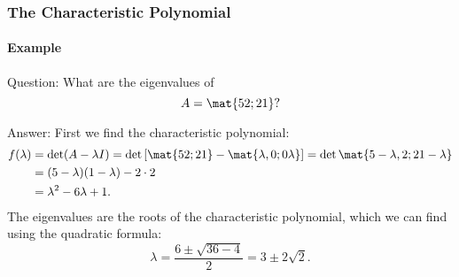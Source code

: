 
\begin{frame}
\frametitle{The Characteristic Polynomial}
\framesubtitle{Example}

\alert{Question:} What are the eigenvalues of 
\[ A = \mat{5 2; 2 1}? \]

\begin{webonly}
\alert{Answer:}
First we find the characteristic polynomial:
\[\begin{split} f(\lambda) &= \det(A-\lambda I)
= \det\left[ \mat{5 2; 2 1} - \mat{\lambda, 0; 0 \lambda} \right]
= \det\mat{5-\lambda, 2; 2 1-\lambda} \\
&= (5-\lambda)(1-\lambda) - 2\cdot 2 \\
&= \lambda^2 - 6\lambda + 1.
\end{split}\]
The eigenvalues are the roots of the characteristic polynomial, which we can
find using the quadratic formula:
\[ \lambda = \frac{6\pm\sqrt{36-4}}2
= 3\pm 2\sqrt 2. \]
\end{webonly}

\end{frame}



